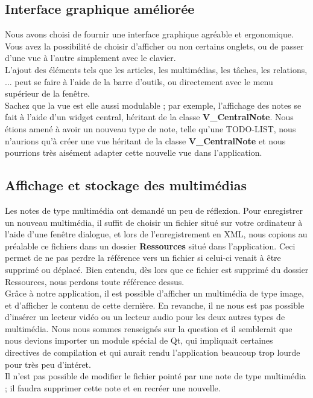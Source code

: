 \documentclass[a4paper]{report}
\begin{document}
\subsection{Interface graphique améliorée}
Nous avons choisi de fournir une interface graphique agréable et ergonomique. Vous avez la possibilité de choisir d'afficher ou non certains onglets, ou de passer d'une vue à l'autre simplement avec le clavier.\\
L'ajout des éléments tels que les articles, les multimédias, les tâches, les relations, ... peut se faire à l'aide de la barre d'outils, ou directement avec le menu supérieur de la fenêtre.\\
Sachez que la vue est elle aussi modulable ; par exemple, l'affichage des notes se fait à l'aide d'un widget central, héritant de la classe \textbf{V\_CentralNote}. Nous étions amené à avoir un nouveau type de note, telle qu'une TODO-LIST, nous n'aurions qu'à créer une vue héritant de la classe \textbf{V\_CentralNote} et nous pourrions très aisément adapter cette nouvelle vue dans l'application.

\subsection{Affichage et stockage des multimédias}
Les notes de type multimédia ont demandé un peu de réflexion. Pour enregistrer un nouveau multimédia, il suffit de choisir un fichier situé sur votre ordinateur à l'aide d'une fenêtre dialogue, et lors de l'enregistrement en XML, nous copions au préalable ce fichiers dans un dossier \textbf{Ressources} situé dans l'application. Ceci permet de ne pas perdre la référence vers un fichier si celui-ci venait à être supprimé ou déplacé. Bien entendu, dès lors que ce fichier est supprimé du dossier Ressources, nous perdons toute référence dessus.\\
Grâce à notre application, il est possible d'afficher un multimédia de type image, et d'afficher le contenu de cette dernière. En revanche, il ne nous est pas possible d'insérer un lecteur vidéo ou un lecteur audio pour les deux autres types de multimédia. Nous nous sommes renseignés sur la question et il semblerait que nous devions importer un module spécial de Qt, qui impliquait certaines directives de compilation et qui aurait rendu l'application beaucoup trop lourde pour très peu d'intéret.\\
Il n'est pas possible de modifier le fichier pointé par une note de type multimédia ; il faudra supprimer cette note et en recréer une nouvelle.
\end{document}
